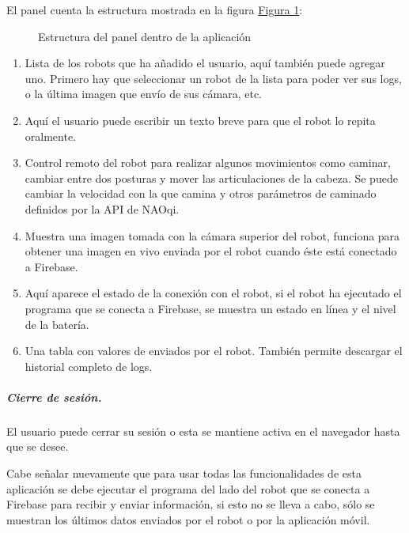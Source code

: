 El panel cuenta la estructura mostrada en la figura \hyperref[\detokenize{users_docs:webappstruct}]{Figura \ref{\detokenize{users_docs:webappstruct}}}:

\begin{figure}[htbp]
\centering
\capstart

\noindent{}
\caption{Estructura del panel dentro de la aplicación}\label{\detokenize{users_docs:webappstruct}}\end{figure}
\begin{enumerate}
\item {} 
Lista de los robots que ha añadido el usuario, aquí también puede agregar uno. Primero hay que seleccionar un robot de la lista para poder ver sus logs, o la última imagen que envío de sus cámara, etc.

\item {} 
Aquí el usuario puede escribir un texto breve para que el robot lo repita oralmente.

\item {} 
Control remoto del robot para realizar algunos movimientos como caminar, cambiar entre dos posturas y mover las articulaciones de la cabeza. Se puede cambiar la velocidad con la que camina y otros parámetros de caminado definidos por la API de NAOqi.

\item {} 
Muestra una imagen tomada con la cámara superior del robot, funciona para obtener una imagen en vivo enviada por el robot cuando éste está conectado a Firebase.

\item {} 
Aquí aparece el estado de la conexión con el robot, si el robot ha ejecutado el programa que se conecta a Firebase, se muestra un estado en línea y el nivel de la batería.

\item {} 
Una tabla con valores de  enviados por el robot. También permite descargar el historial completo de logs.

\end{enumerate}


\subparagraph{Cierre de sesión.}
\label{\detokenize{users_docs:cierre-de-sesion}}
El usuario puede cerrar su sesión o esta se mantiene activa en el navegador
hasta que se desee.

Cabe señalar nuevamente que para usar todas las funcionalidades de esta
aplicación se debe ejecutar el programa del lado del robot que se conecta a
Firebase para recibir y enviar información, si esto no se lleva a cabo, sólo
se muestran los últimos datos enviados por el robot o por la aplicación móvil.

